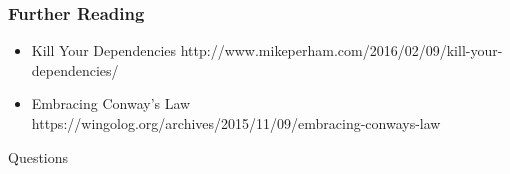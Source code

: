 \documentclass{beamer}
\begin{document}
  \begin{frame}
      \frametitle{Further Reading}
      \begin{itemize}
          \item Kill Your Dependencies http://www.mikeperham.com/2016/02/09/kill-your-dependencies/
          \item Embracing Conway's Law https://wingolog.org/archives/2015/11/09/embracing-conways-law
      \end{itemize}
  \end{frame}
  \begin{frame}
      \centerline{\color{blue}\Large Questions}
  \end{frame}
\end{document}
